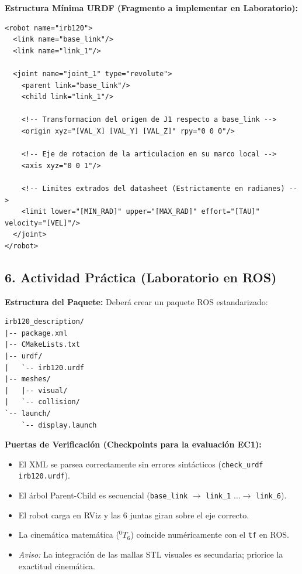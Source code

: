 \documentclass[11pt, a4paper]{article}
\begin{document}
\textbf{Estructura Mínima URDF (Fragmento a implementar en Laboratorio):}
\begin{lstlisting}
<robot name="irb120">
  <link name="base_link"/>
  <link name="link_1"/>

  <joint name="joint_1" type="revolute">
    <parent link="base_link"/>
    <child link="link_1"/>

    <!-- Transformacion del origen de J1 respecto a base_link -->
    <origin xyz="[VAL_X] [VAL_Y] [VAL_Z]" rpy="0 0 0"/>
    
    <!-- Eje de rotacion de la articulacion en su marco local -->
    <axis xyz="0 0 1"/>

    <!-- Limites extrados del datasheet (Estrictamente en radianes) -->
    <limit lower="[MIN_RAD]" upper="[MAX_RAD]" effort="[TAU]" velocity="[VEL]"/>
  </joint>
</robot>
\end{lstlisting}

\newpage
\subsection*{6. Actividad Práctica (Laboratorio en ROS)}
\textbf{Estructura del Paquete:} Deberá crear un paquete ROS estandarizado:
\begin{lstlisting}[basicstyle=\ttfamily\footnotesize, backgroundcolor=\color{white}]
irb120_description/
|-- package.xml
|-- CMakeLists.txt
|-- urdf/
|   `-- irb120.urdf
|-- meshes/
|   |-- visual/
|   `-- collision/
`-- launch/
    `-- display.launch
\end{lstlisting}

\textbf{Puertas de Verificación (Checkpoints para la evaluación EC1):}
\begin{itemize}
    \item[$\square$] El XML se parsea correctamente sin errores sintácticos (\texttt{check\_urdf irb120.urdf}).
    \item[$\square$] El árbol Parent-Child es secuencial (\texttt{base\_link} $\to$ \texttt{link\_1} $\dots \to$ \texttt{link\_6}).
    \item[$\square$] El robot carga en RViz y las 6 juntas giran sobre el eje correcto.
    \item[$\square$] La cinemática matemática ($^0T_6$) coincide numéricamente con el \texttt{tf} en ROS.
    \item[$\square$] \textit{Aviso:} La integración de las mallas STL visuales es secundaria; priorice la exactitud cinemática.
\end{itemize}
\end{document}
